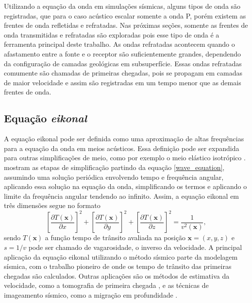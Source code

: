 Utilizando a equação da onda em simulações sísmicas, alguns tipos de onda são registradas, que para o caso acústico escalar somente a onda P, porém existem as frentes de onda refletidas e refratadas. Nas próximas seções, somente as frentes de onda transmitidas e refratadas são exploradas pois esse tipo de onda é a ferramenta principal deste trabalho. As ondas refratadas acontecem quando o afastamento entre a fonte e o receptor são suficientemente grandes, dependendo da configuração de camadas geológicas em subsuperfície. Essas ondas refratadas comumente são chamadas de primeiras chegadas, pois se propagam em camadas de maior velocidade e assim são registradas em um tempo menor que as demais frentes de onda.          

\subsection*{Equação \textit{eikonal}}

A equação eikonal pode ser definida como uma aproximação de altas frequências para a equação da onda em meios acústicos. Essa definição pode ser expandida para outras simplificações de meio, como por exemplo o meio elástico isotrópico \cite{cerveny2003seismic}.  mostram as etapas de simplificação partindo da equação \ref{wave_equation}, assumindo uma solução periódica envolvendo tempo e frequência angular, aplicando essa solução na equação da onda, simplificando os termos e aplicando o limite da frequência angular tendendo ao infinito. Assim, a equação eikonal em três dimensões segue no formato 
\begin{equation}
	\left[\dfrac{\partial T(\mathbf{x})}{\partial x}\right]^2 + \left[\dfrac{\partial T(\mathbf{x})}{\partial y}\right]^2 + \left[\dfrac{\partial T(\mathbf{x})}{\partial z}\right]^2 = \dfrac{1}{v^2(\mathbf{x})}, 	
	\label{eikonal_full}
\end{equation} 
\noindent sendo $T(\mathbf{x})$ a função tempo de trânsito avaliada na posição $\mathbf{x} = (x,y,z)$ e $s = 1/v$ pode ser chamado de vagarosidade, o inverso da velocidade. A principal aplicação da equação eikonal utilizando o método sísmico parte da modelagem sísmica, com o trabalho pioneiro de  onde os tempo de trânsito das primeiras chegadas são calculados. Outras aplicações são os métodos de estimativa da velocidade, como a tomografia de primeira chegada \cite{zhang1998nonlinear, sei1994gradient, tromp2005seismic, taillandier2009first},  e as técnicas de imageamento sísmico, como a migração em profundidade   \cite{gray1994kirchhoff, zhang2006refraction}.  
 
